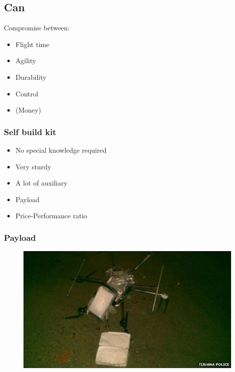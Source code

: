 \subsection{Can}


\begin{frame}
  Compromise between:
  \begin{itemize}
    \item Flight time
    \item Agility
    \item Durability
    \item Control
	\item (Money)
		
  \end{itemize}
\end{frame}



\begin{frame}
\frametitle{Self build kit}

  \begin{itemize}
    \item No special knowledge required    
	\item Very sturdy
	\item A lot of auxiliary
	\item Payload    
	\item Price-Performance ratio
  \end{itemize}
  
\end{frame}



\begin{frame}
\frametitle{Payload}

  \begin{figure}
  \includegraphics[scale=0.6]{pic/03_our-copter/drug.jpg}
  \end{figure}
  
\end{frame}



